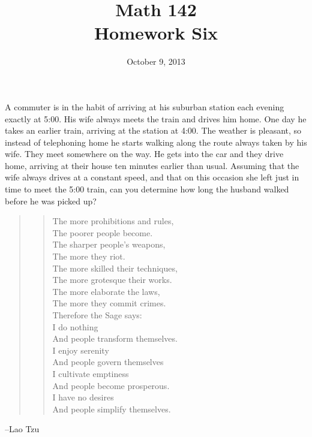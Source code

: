 \documentclass{exam}
\author{}
\date{October 9, 2013}
\title{Math 142 \\ Homework Six}
\begin{document}
  \maketitle

  A commuter is in the habit of arriving at his suburban station each evening exactly at 5:00.  His wife always meets
  the train and drives him home.  One day he takes an earlier train, arriving at the station at 4:00.  The weather is
  pleasant, so instead of telephoning home he starts walking along the route always taken by his wife.  They meet
  somewhere on the way.  He gets into the car and they drive home, arriving at their house ten minutes earlier than
  usual.  Assuming that the wife always drives at a constant speed, and that on this occasion she left just in time to
  meet the 5:00 train, can you determine how long the husband walked before he was picked up?

  \vspace{4 cm}
  \begin{quote}
    \begin{em}
      \begin{verse}
        The more prohibitions and rules, \\
        The poorer people become. \\
        The sharper people's weapons, \\
        The more they riot. \\
        The more skilled their techniques, \\
        The more grotesque their works. \\
        The more elaborate the laws, \\
        The more they commit crimes. \\
        \vspace{.2 cm}
        Therefore the Sage says: \\
        \vspace{.2 cm}
        I do nothing \\
        And people transform themselves. \\
        I enjoy serenity \\
        And people govern themselves \\
        I cultivate emptiness \\
        And people become prosperous. \\
        I have no desires \\
        And people simplify themselves. \\
      \end{verse}

    \end{em}
  \end{quote}
  \hspace{2 cm} --Lao Tzu
\end{document}
